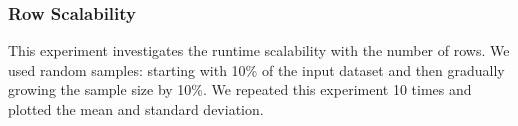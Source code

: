 \subsubsection{Row Scalability}
This experiment investigates the runtime scalability with the number of rows. 
We used random samples: starting with 10\% of the input dataset and then gradually growing the sample size by 10\%.
We repeated this experiment 10 times and plotted the mean and standard deviation.

